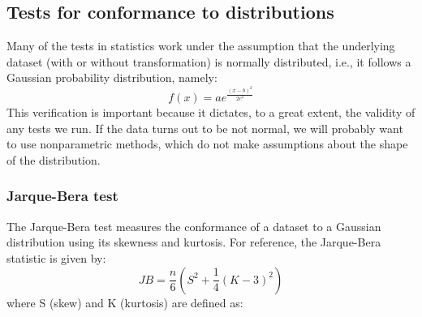 \documentclass[10pt]{article}
\begin{document}
\subsection{Tests for conformance to distributions}
Many of the tests in statistics work under the assumption that the underlying dataset (with or without transformation) is normally distributed, i.e., it follows a Gaussian probability distribution, namely:\\
\[f(x) = a e^ {\frac{(x-b)^2}{2c^2}}\]
This verification is important because it dictates, to a great extent, the validity of any tests we run. If the data turns out to be not normal, we will probably want to use nonparametric methods, which do not make assumptions about the shape of the distribution.
\subsubsection{Jarque-Bera test}
The Jarque-Bera test measures the conformance of a dataset to a Gaussian distribution using its skewness and kurtosis. For reference, the Jarque-Bera statistic is given by:\\

\[{JB}=\frac{n}{6} \left( S^2 + \frac14 (K-3)^2 \right)\]
where S (skew) and K (kurtosis) are defined as:
\end{document}
